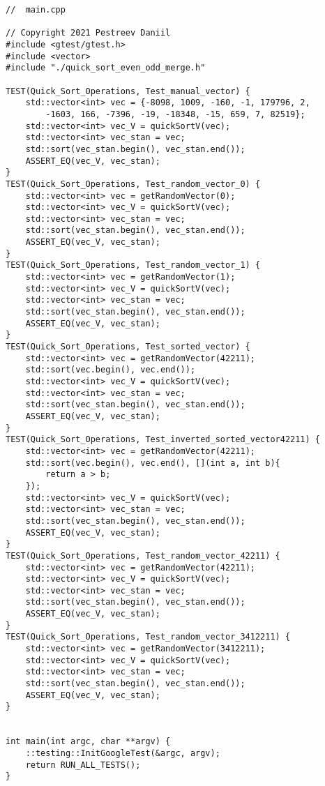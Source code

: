 \documentclass{report}
\begin{document}
\begin{lstlisting}
//  main.cpp

// Copyright 2021 Pestreev Daniil
#include <gtest/gtest.h>
#include <vector>
#include "./quick_sort_even_odd_merge.h"

TEST(Quick_Sort_Operations, Test_manual_vector) {
    std::vector<int> vec = {-8098, 1009, -160, -1, 179796, 2,
        -1603, 166, -7396, -19, -18348, -15, 659, 7, 82519};
    std::vector<int> vec_V = quickSortV(vec);
    std::vector<int> vec_stan = vec;
    std::sort(vec_stan.begin(), vec_stan.end());
    ASSERT_EQ(vec_V, vec_stan);
}
TEST(Quick_Sort_Operations, Test_random_vector_0) {
    std::vector<int> vec = getRandomVector(0);
    std::vector<int> vec_V = quickSortV(vec);
    std::vector<int> vec_stan = vec;
    std::sort(vec_stan.begin(), vec_stan.end());
    ASSERT_EQ(vec_V, vec_stan);
}
TEST(Quick_Sort_Operations, Test_random_vector_1) {
    std::vector<int> vec = getRandomVector(1);
    std::vector<int> vec_V = quickSortV(vec);
    std::vector<int> vec_stan = vec;
    std::sort(vec_stan.begin(), vec_stan.end());
    ASSERT_EQ(vec_V, vec_stan);
}
TEST(Quick_Sort_Operations, Test_sorted_vector) {
    std::vector<int> vec = getRandomVector(42211);
    std::sort(vec.begin(), vec.end());
    std::vector<int> vec_V = quickSortV(vec);
    std::vector<int> vec_stan = vec;
    std::sort(vec_stan.begin(), vec_stan.end());
    ASSERT_EQ(vec_V, vec_stan);
}
TEST(Quick_Sort_Operations, Test_inverted_sorted_vector42211) {
    std::vector<int> vec = getRandomVector(42211);
    std::sort(vec.begin(), vec.end(), [](int a, int b){
        return a > b;
    });
    std::vector<int> vec_V = quickSortV(vec);
    std::vector<int> vec_stan = vec;
    std::sort(vec_stan.begin(), vec_stan.end());
    ASSERT_EQ(vec_V, vec_stan);
}
TEST(Quick_Sort_Operations, Test_random_vector_42211) {
    std::vector<int> vec = getRandomVector(42211);
    std::vector<int> vec_V = quickSortV(vec);
    std::vector<int> vec_stan = vec;
    std::sort(vec_stan.begin(), vec_stan.end());
    ASSERT_EQ(vec_V, vec_stan);
}
TEST(Quick_Sort_Operations, Test_random_vector_3412211) {
    std::vector<int> vec = getRandomVector(3412211);
    std::vector<int> vec_V = quickSortV(vec);
    std::vector<int> vec_stan = vec;
    std::sort(vec_stan.begin(), vec_stan.end());
    ASSERT_EQ(vec_V, vec_stan);
}


int main(int argc, char **argv) {
    ::testing::InitGoogleTest(&argc, argv);
    return RUN_ALL_TESTS();
}

\end{lstlisting}
\end{document}
